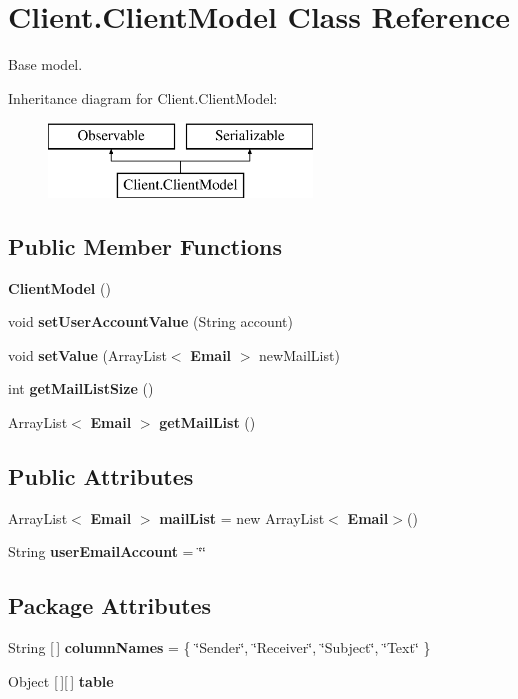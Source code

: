 \section{Client.\+Client\+Model Class Reference}
\label{class_client_1_1_client_model}


Base model.  


Inheritance diagram for Client.\+Client\+Model\+:\begin{figure}[H]
\begin{center}
\leavevmode
\includegraphics[height=2.000000cm]{class_client_1_1_client_model}
\end{center}
\end{figure}
\subsection*{Public Member Functions}
\begin{DoxyCompactItemize}
\item 
\textbf{ Client\+Model} ()
\item 
void \textbf{ set\+User\+Account\+Value} (String account)
\item 
void \textbf{ set\+Value} (Array\+List$<$ \textbf{ Email} $>$ new\+Mail\+List)
\item 
int \textbf{ get\+Mail\+List\+Size} ()
\item 
Array\+List$<$ \textbf{ Email} $>$ \textbf{ get\+Mail\+List} ()
\end{DoxyCompactItemize}
\subsection*{Public Attributes}
\begin{DoxyCompactItemize}
\item 
Array\+List$<$ \textbf{ Email} $>$ \textbf{ mail\+List} = new Array\+List$<$\textbf{ Email}$>$()
\item 
String \textbf{ user\+Email\+Account} = \char`\"{}\char`\"{}
\end{DoxyCompactItemize}
\subsection*{Package Attributes}
\begin{DoxyCompactItemize}
\item 
String [$\,$] \textbf{ column\+Names} = \{ \char`\"{}Sender\char`\"{}, \char`\"{}Receiver\char`\"{}, \char`\"{}Subject\char`\"{}, \char`\"{}Text\char`\"{} \}
\item 
Object [$\,$][$\,$] \textbf{ table}
\end{DoxyCompactItemize}


